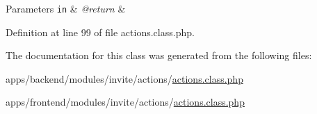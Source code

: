 \begin{DoxyParams}[1]{Parameters}
\mbox{\tt in}  & {\em @return} & \\
\hline
\end{DoxyParams}


Definition at line 99 of file actions.\-class.\-php.



The documentation for this class was generated from the following files\-:\begin{DoxyCompactItemize}
\item 
apps/backend/modules/invite/actions/\hyperlink{backend_2modules_2invite_2actions_2actions_8class_8php}{actions.\-class.\-php}\item 
apps/frontend/modules/invite/actions/\hyperlink{frontend_2modules_2invite_2actions_2actions_8class_8php}{actions.\-class.\-php}\end{DoxyCompactItemize}
